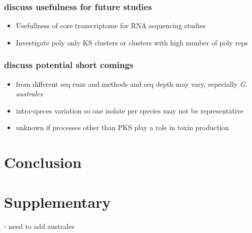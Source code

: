 \documentclass[12pt]{article}
\begin{document}
\subsubsection*{discuss usefulness for future studies}
\begin{itemize}
\item Usefullness of core transcriptome for RNA sequencing studies
\item Investigate poly only KS clusters or clusters with high number of poly reps
\end{itemize}

\subsubsection*{discuss potential short comings} 
\begin{itemize}
\item from different seq runs and methods and seq depth may vary, especially \textit{G. australes}
\item intra-speces variation so one isolate per species may not be representative
\item unknown if processes other than PKS play a role in toxin production
\end{itemize}

\section*{Conclusion}


\section*{Supplementary}
- need to add australes
\end{document}
